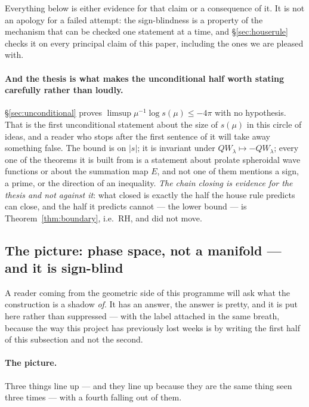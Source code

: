 \documentclass[11pt,a4paper]{article}
\theoremstyle{plain}
\theoremstyle{definition}
\theoremstyle{remark}
\newcommand{\R}{\mathbb{R}}
\newcommand{\Z}{\mathbb{Z}}
\newcommand{\Q}{\mathbb{Q}}
\newcommand{\A}{\mathbb{A}}
\newcommand{\E}{\mathcal{E}}
\newcommand{\F}{\mathcal{F}}
\newcommand{\QW}{QW}
\def\QW{QW}\def\E{E}\def\F{F}\def\R{R}\def\Q{Q}\def\Z{Z}\def\A{A}%
\begin{document}
Everything below is either evidence for that claim or a consequence of it.  It
is not an apology for a failed attempt: the sign-blindness is a property of the
mechanism that can be checked one statement at a time, and \S\ref{sec:houserule}
checks it on every principal claim of this paper, including the ones we are
pleased with.

\paragraph{And the thesis is what makes the unconditional half worth stating
carefully rather than loudly.}  \S\ref{sec:unconditional} proves
$\limsup\mu^{-1}\log s(\mu)\le-4\pi$ with no hypothesis.  That is the first
unconditional statement about the size of $s(\mu)$ in this circle of ideas, and
a reader who stops after the first sentence of it will take away something
false.  The bound is on $|s|$; it is invariant under
$\QW_\lambda\mapsto-\QW_\lambda$; every one of the theorems it is built
from is a statement about prolate spheroidal wave functions or about the
summation map $\E$, and not one of them mentions a sign, a prime, or the
direction of an inequality.  \emph{The chain closing is evidence for the thesis
and not against it}: what closed is exactly the half the house rule predicts can
close, and the half it predicts cannot --- the lower bound --- is
Theorem~\ref{thm:boundary}, i.e.\ RH, and did not move.

\subsection{The picture: phase space, not a manifold --- and it is sign-blind}
\label{sec:phasespace}

A reader coming from the geometric side of this programme will ask what the
construction is a shadow \emph{of}.  It has an answer, the answer is pretty, and
it is put here rather than suppressed --- with the label attached in the same
breath, because the way this project has previously lost weeks is by writing the
first half of this subsection and not the second.

\paragraph{The picture.}  Three things line up --- and they line up because they
are the same thing seen three times --- with a fourth falling out of them.
\end{document}
